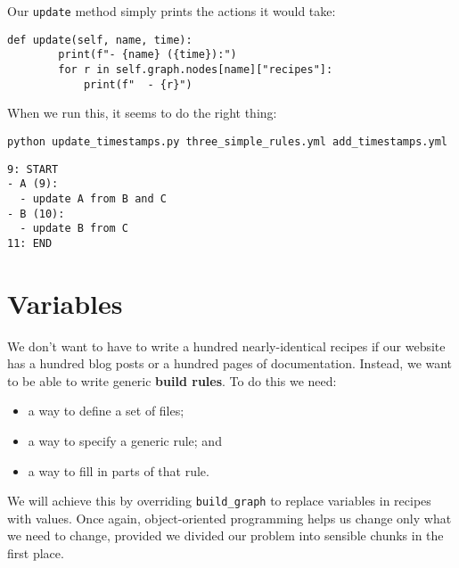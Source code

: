 \documentclass{scrbook}
\newcommand{\glossref}[1]{\textbf{#1}}
\begin{document}
Our \texttt{update} method simply prints the actions it would take:


\begin{lstlisting}[frame=single,frameround=tttt]
    def update(self, name, time):
        print(f"- {name} ({time}):")
        for r in self.graph.nodes[name]["recipes"]:
            print(f"  - {r}")
\end{lstlisting}



When we run this,
it seems to do the right thing:


\begin{lstlisting}[frame=single,frameround=tttt]
python update_timestamps.py three_simple_rules.yml add_timestamps.yml
\end{lstlisting}



\begin{lstlisting}[frame=single,frameround=tttt]
9: START
- A (9):
  - update A from B and C
- B (10):
  - update B from C
11: END
\end{lstlisting}


\section{Variables}\label{builder-variables}


We don't want to have to write a hundred nearly-identical recipes
if our website has a hundred blog posts
or a hundred pages of documentation.
Instead,
we want to be able to write generic \glossref{build rules}.
To do this we need:

\begin{itemize}

\item 

a way to define a set of files;



\item 

a way to specify a generic rule;
    and



\item 

a way to fill in parts of that rule.



\end{itemize}


We will achieve this by overriding \texttt{build\_graph} to replace variables in recipes with values.
Once again,
object-oriented programming helps us change only what we need to change,
provided we divided our problem into sensible chunks in the first place.
\end{document}
